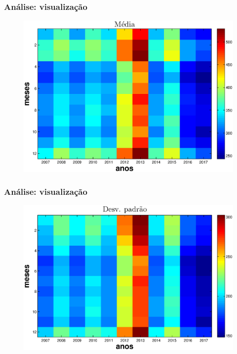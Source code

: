 \documentclass[xcolor=dvipsnames,xcolor=table]{beamer}
\begin{document}
\begin{frame}\frametitle{Análise: visualização}
\begin{figure}[htpb] \begin{center} 
\includegraphics[width=0.9\columnwidth]{media1}
\end{center}
\end{figure}
\end{frame}

\begin{frame}\frametitle{Análise: visualização}
\begin{figure}[htpb] \begin{center} 
\includegraphics[width=0.9\columnwidth]{sd1}
\end{center}
\end{figure}
\end{frame}
\end{document}
